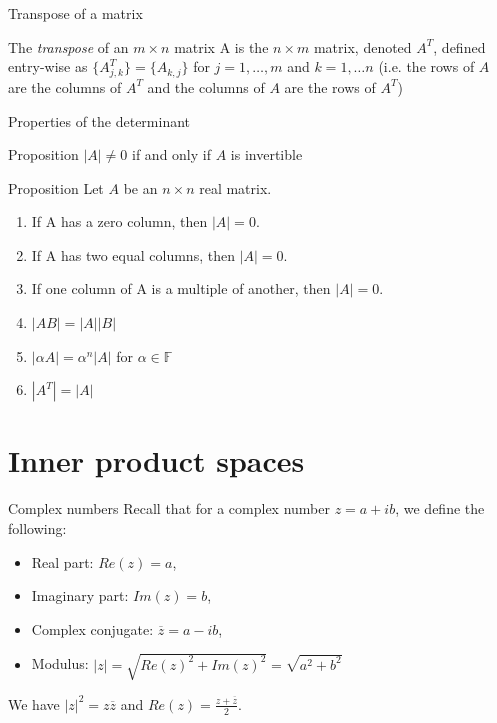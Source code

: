 \documentclass [aspectratio=169]{beamer}
\newcommand{\F}{{\mathbb{F}}}
\begin{document}
\begin{frame}{Transpose of a matrix}
\begin{definition}
The \emph{transpose} of an $m \times n$ matrix A is the $n \times m$ matrix, denoted $A^T$, defined entry-wise as $\{A^T_{j,k}\} = \{A_{k,j}\}$ for $j=1,\ldots,m$ and $k=1,\ldots n$ (i.e. the rows of $A$ are the columns of $A^T$ and the columns of $A$ are the rows of $A^T$)
\end{definition}
\vspace{1cm}
\end{frame}



\begin{frame}{Properties of the determinant}
\begin{exampleblock}{Proposition}
$|A| \neq 0$ if and only if $A$ is invertible
\end{exampleblock}

\begin{exampleblock}{Proposition}
Let $A$ be an $n \times n$ real matrix.
\begin{enumerate}
    \item If A has a zero column, then $|A| = 0$.
\item If A has two equal columns, then $|A| = 0$.
\item If one column of A is a multiple of another, then $|A| = 0$.
\item $|AB| = |A| |B|$
\item $|\alpha A| = \alpha^n |A|$ for $\alpha \in \F$
\item $|A^T| = |A|$
\end{enumerate}
\end{exampleblock}
\end{frame}

\section{Inner product spaces}


\begin{frame}{Complex numbers}
Recall that for a complex number $z = a + ib$, we define the following:
\vspace{0.5em}
\begin{itemize}
      \setlength\itemsep{0.5em}
\item Real part: $Re(z) = a$,
\item Imaginary part: $Im(z) = b$,
\item Complex conjugate: $\overline{z}= a -ib$, 
\item Modulus: $|z| = \sqrt{Re(z)^2 + Im(z)^2} = \sqrt{a^2 + b^2}$
\end{itemize}

\vspace{1em}

We have $|z|^2 = z \overline{z}$ and $Re(z) = \frac{z + \overline{z}}{2}$.
\end{frame}
\end{document}
